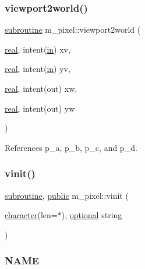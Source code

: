\subsubsection{\texorpdfstring{viewport2world()}{viewport2world()}}
{\footnotesize\ttfamily \hyperlink{M__stopwatch_83_8txt_acfbcff50169d691ff02d4a123ed70482}{subroutine} m\+\_\+pixel\+::viewport2world (\begin{DoxyParamCaption}\item[{\hyperlink{read__watch_83_8txt_abdb62bde002f38ef75f810d3a905a823}{real}, intent(\hyperlink{M__journal_83_8txt_afce72651d1eed785a2132bee863b2f38}{in})}]{xv,  }\item[{\hyperlink{read__watch_83_8txt_abdb62bde002f38ef75f810d3a905a823}{real}, intent(\hyperlink{M__journal_83_8txt_afce72651d1eed785a2132bee863b2f38}{in})}]{yv,  }\item[{\hyperlink{read__watch_83_8txt_abdb62bde002f38ef75f810d3a905a823}{real}, intent(out)}]{xw,  }\item[{\hyperlink{read__watch_83_8txt_abdb62bde002f38ef75f810d3a905a823}{real}, intent(out)}]{yw }\end{DoxyParamCaption})\hspace{0.3cm}{\ttfamily [private]}}



References p\+\_\+a, p\+\_\+b, p\+\_\+c, and p\+\_\+d.

\mbox{\label{namespacem__pixel_ac03ca8f23fdadb60599b6ea4dc87a6d9}} 
\subsubsection{\texorpdfstring{vinit()}{vinit()}}
{\footnotesize\ttfamily \hyperlink{M__stopwatch_83_8txt_acfbcff50169d691ff02d4a123ed70482}{subroutine}, \hyperlink{M__stopwatch_83_8txt_a2f74811300c361e53b430611a7d1769f}{public} m\+\_\+pixel\+::vinit (\begin{DoxyParamCaption}\item[{\hyperlink{option__stopwatch_83_8txt_abd4b21fbbd175834027b5224bfe97e66}{character}(len=$\ast$), \hyperlink{option__stopwatch_83_8txt_aa4ece75e7acf58a4843f70fe18c3ade5}{optional}}]{string }\end{DoxyParamCaption})}



\subsubsection*{N\+A\+ME}

